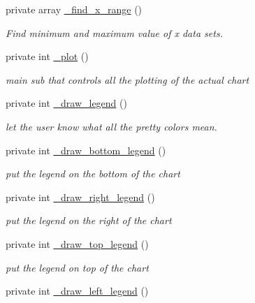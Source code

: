 \begin{DoxyCompactItemize}
private array \hyperlink{classChart_1_1Base_ab5b79dbb6f086902396bf5fd4c2248ef}{\_\-find\_\-x\_\-range} ()
\begin{DoxyCompactList}\small\item\em Find minimum and maximum value of x data sets. \item\end{DoxyCompactList}\item 
private int \hyperlink{classChart_1_1Base_aa13b0e86a933ce6b865c098fd0bdb37d}{\_\-plot} ()
\begin{DoxyCompactList}\small\item\em main sub that controls all the plotting of the actual chart \item\end{DoxyCompactList}\item 
private int \hyperlink{classChart_1_1Base_a530e742ca18ce2e89f177d367964277f}{\_\-draw\_\-legend} ()
\begin{DoxyCompactList}\small\item\em let the user know what all the pretty colors mean. \item\end{DoxyCompactList}\item 
private int \hyperlink{classChart_1_1Base_a863d96ec45b7fbd5ff05194f4eb827d0}{\_\-draw\_\-bottom\_\-legend} ()
\begin{DoxyCompactList}\small\item\em put the legend on the bottom of the chart \item\end{DoxyCompactList}\item 
private int \hyperlink{classChart_1_1Base_a39f25b556f2d82e176fc6b0ccfc6da17}{\_\-draw\_\-right\_\-legend} ()
\begin{DoxyCompactList}\small\item\em put the legend on the right of the chart \item\end{DoxyCompactList}\item 
private int \hyperlink{classChart_1_1Base_a2f3f15efadc46484126c94780748a534}{\_\-draw\_\-top\_\-legend} ()
\begin{DoxyCompactList}\small\item\em put the legend on top of the chart \item\end{DoxyCompactList}\item 
private int \hyperlink{classChart_1_1Base_a39bad67aecd83bf523bc27d397256480}{\_\-draw\_\-left\_\-legend} ()

\end{DoxyCompactItemize}
